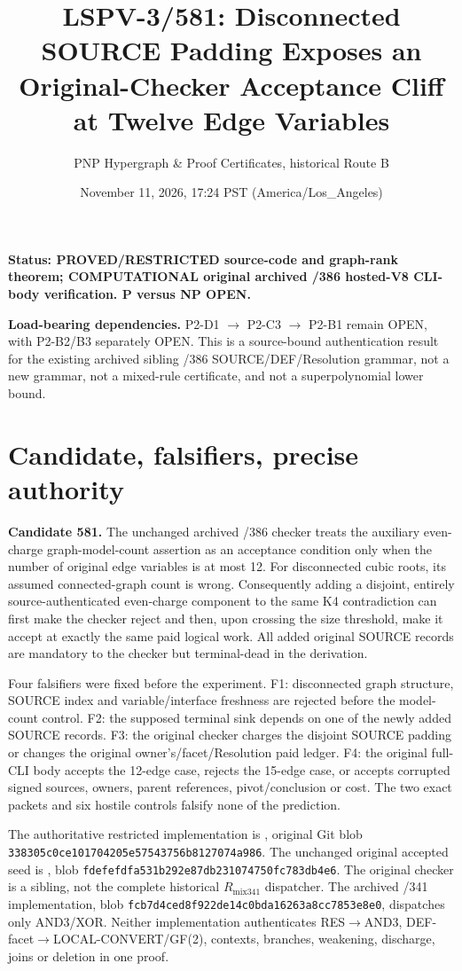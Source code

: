 \documentclass[11pt]{article}
\title{LSPV-3/581: Disconnected SOURCE Padding Exposes an\\ Original-Checker Acceptance Cliff at Twelve Edge Variables}
\author{PNP Hypergraph \& Proof Certificates, historical Route B}
\date{November 11, 2026, 17:24 PST (America/Los\_Angeles)}
\begin{document}
\maketitle
\noindent\textbf{Status: PROVED/RESTRICTED source-code and graph-rank theorem; COMPUTATIONAL original archived /386 hosted-V8 CLI-body verification. P versus NP OPEN.}
\par
\textbf{Load-bearing dependencies.} P2-D1 $\longrightarrow$ P2-C3 $\longrightarrow$ P2-B1 remain OPEN, with P2-B2/B3 separately OPEN. This is a source-bound authentication result for the existing archived sibling /386 SOURCE/DEF/Resolution grammar, not a new grammar, not a mixed-rule certificate, and not a superpolynomial lower bound.
\section{Candidate, falsifiers, precise authority}
\textbf{Candidate 581.} The unchanged archived /386 checker treats the auxiliary even-charge graph-model-count assertion as an acceptance condition only when the number of original edge variables is at most 12. For disconnected cubic roots, its assumed connected-graph count is wrong. Consequently adding a disjoint, entirely source-authenticated even-charge component to the same K4 contradiction can first make the checker reject and then, upon crossing the size threshold, make it accept at exactly the same paid logical work. All added original SOURCE records are mandatory to the checker but terminal-dead in the derivation.
\par
Four falsifiers were fixed before the experiment. F1: disconnected graph structure, SOURCE index and variable/interface freshness are rejected before the model-count control. F2: the supposed terminal sink depends on one of the newly added SOURCE records. F3: the original checker charges the disjoint SOURCE padding or changes the original owner's/facet/Resolution paid ledger. F4: the original full-CLI body accepts the 12-edge case, rejects the 15-edge case, or accepts corrupted signed sources, owners, parent references, pivot/conclusion or cost. The two exact packets and six hostile controls falsify none of the prediction.
\par
The authoritative restricted implementation is , original Git blob \texttt{338305c0ce101704205e57543756b8127074a986}. The unchanged original accepted seed is , blob \texttt{fdefefdfa531b292e87db231074750fc783db4e6}. The original checker is a sibling, not the complete historical $R_{\mathrm{mix341}}$ dispatcher. The archived /341 implementation, blob \texttt{fcb7d4ced8f922de14c0bda16263a8cc7853e8e0}, dispatches only AND3/XOR. Neither implementation authenticates RES$\to$AND3, DEF-facet$\to$LOCAL-CONVERT/GF(2), contexts, branches, weakening, discharge, joins or deletion in one proof.
\end{document}
